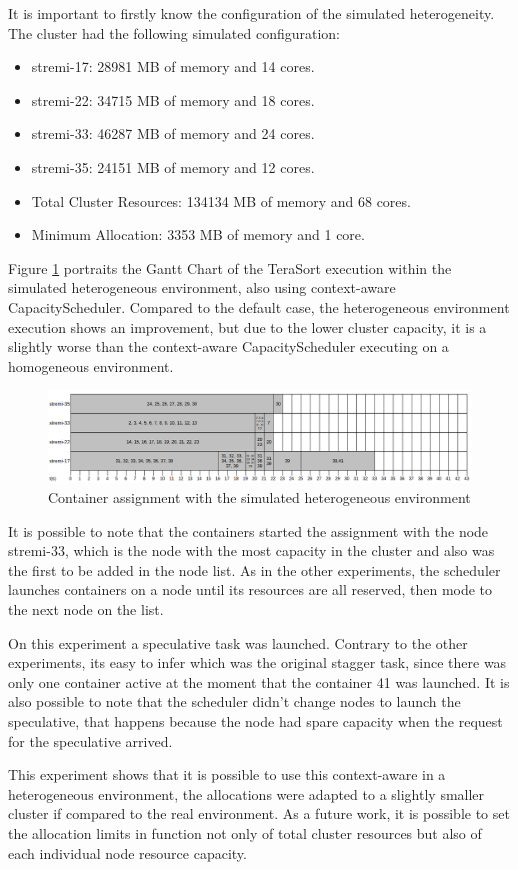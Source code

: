 It is important to firstly know the configuration of the simulated heterogeneity. The cluster had the following simulated configuration:

\begin{itemize}
	\item stremi-17: 28981 MB of memory and 14 cores.
	\item stremi-22: 34715 MB of memory and 18 cores.
	\item stremi-33: 46287 MB of memory and 24 cores.
	\item stremi-35: 24151 MB of memory and 12 cores.
	\item Total Cluster Resources: 134134 MB of memory and 68 cores.
	\item Minimum Allocation: 3353 MB of memory and 1 core.
\end{itemize}

Figure \ref{fig:ganttSimulation} portraits the Gantt Chart of the TeraSort execution within the simulated heterogeneous environment, also using context-aware CapacityScheduler. Compared to the default case, the heterogeneous environment execution shows an improvement, but due to the lower cluster capacity, it is a slightly worse than the context-aware CapacityScheduler executing on a homogeneous environment.

\begin{figure}[hbtn]
   \renewcommand{\figurename}{Figure}
   \centering
   \includegraphics[width=15cm]{figuras/Figura21-GanttSimulation.png}
   \caption{Container assignment with the simulated heterogeneous environment}
   \label{fig:ganttSimulation}
\end{figure}

It is possible to note that the containers started the assignment with the node stremi-33, which is the node with the most capacity in the cluster and also was the first to be added in the node list. As in the other experiments, the scheduler launches containers on a node until its resources are all reserved, then mode to the next node on the list.

On this experiment a speculative task was launched. Contrary to the other experiments, its easy to infer which was the original stagger task, since there was only one container active at the moment that the container 41 was launched. It is also possible to note that the scheduler didn't change nodes to launch the speculative, that happens because the node had spare capacity when the request for the speculative arrived.

This experiment shows that it is possible to use this context-aware in a heterogeneous environment, the allocations were adapted to a slightly smaller cluster if compared to the real environment. As a future work, it is possible to set the allocation limits in function not only of total cluster resources but also of each individual node resource capacity.